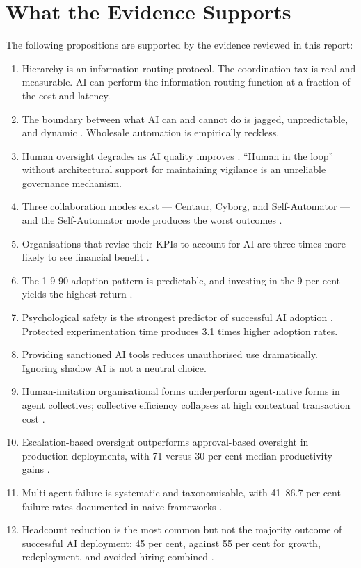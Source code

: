 \section{What the Evidence Supports}

The following propositions are supported by the evidence reviewed in this report:

\begin{enumerate}
  \item Hierarchy is an information routing protocol. The coordination tax is real and measurable. AI can perform the information routing function at a fraction of the cost and latency.
  \item The boundary between what AI can and cannot do is jagged, unpredictable, and dynamic \parencite{DellAcqua2026}. Wholesale automation is empirically reckless.
  \item Human oversight degrades as AI quality improves \parencite{DellAcqua2023}. ``Human in the loop'' without architectural support for maintaining vigilance is an unreliable governance mechanism.
  \item Three collaboration modes exist --- Centaur, Cyborg, and Self-Automator --- and the Self-Automator mode produces the worst outcomes \parencite{Randazzo2024}.
  \item Organisations that revise their KPIs to account for AI are three times more likely to see financial benefit \parencite{BCGAIKPIs2025}.
  \item The 1-9-90 adoption pattern is predictable, and investing in the 9 per cent yields the highest return \parencite{BCGAgenticShift2025}.
  \item Psychological safety is the strongest predictor of successful AI adoption \parencite{EdmondsonLei2025, GoogleAristotle2025}. Protected experimentation time produces 3.1 times higher adoption rates.
  \item Providing sanctioned AI tools reduces unauthorised use dramatically. Ignoring shadow AI is not a neutral choice.
  \item Human-imitation organisational forms underperform agent-native forms in agent collectives; collective efficiency collapses at high contextual transaction cost \parencite{Liu2026}.
  \item Escalation-based oversight outperforms approval-based oversight in production deployments, with 71 versus 30 per cent median productivity gains \parencite{Pereira2026Playbook}.
  \item Multi-agent failure is systematic and taxonomisable, with 41--86.7 per cent failure rates documented in naive frameworks \parencite{Cemri2025}.
  \item Headcount reduction is the most common but not the majority outcome of successful AI deployment: 45 per cent, against 55 per cent for growth, redeployment, and avoided hiring combined \parencite{Pereira2026Playbook, RampRevelio2026}.
\end{enumerate}

